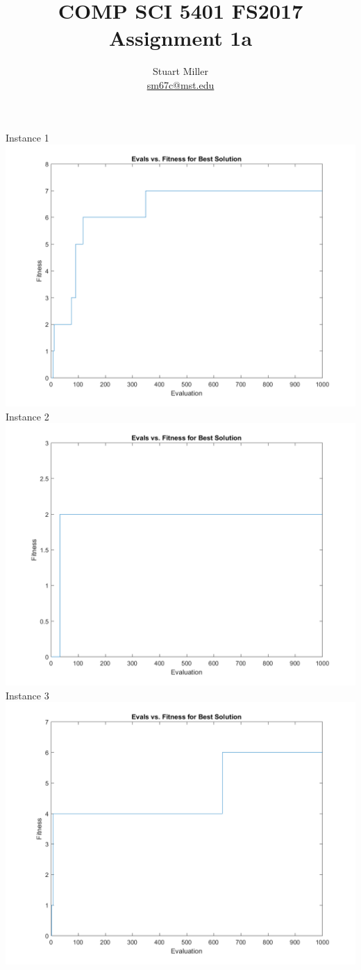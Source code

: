 \documentclass[11pt]{article}
\begin{document}
	\title{COMP SCI 5401 FS2017 Assignment 1a}
	\author{Stuart Miller\\\href{mailto:sm67c@mst.edu}{sm67c@mst.edu}}
	\maketitle
	
	\centering
	Instance 1
	\includegraphics[width=6.25in]{graph_log_instance1.png}
	\newpage
	Instance 2
	\includegraphics[width=6.25in]{graph_log_instance2.png}
	\newpage
	Instance 3
	\includegraphics[width=6.25in]{graph_log_instance3.png}
	
\end{document}
